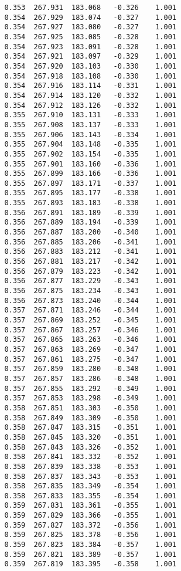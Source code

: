 \begin{verbatim}
   0.353  267.931  183.068   -0.326    1.001
   0.354  267.929  183.074   -0.327    1.001
   0.354  267.927  183.080   -0.327    1.001
   0.354  267.925  183.085   -0.328    1.001
   0.354  267.923  183.091   -0.328    1.001
   0.354  267.921  183.097   -0.329    1.001
   0.354  267.920  183.103   -0.330    1.001
   0.354  267.918  183.108   -0.330    1.001
   0.354  267.916  183.114   -0.331    1.001
   0.354  267.914  183.120   -0.332    1.001
   0.354  267.912  183.126   -0.332    1.001
   0.355  267.910  183.131   -0.333    1.001
   0.355  267.908  183.137   -0.333    1.001
   0.355  267.906  183.143   -0.334    1.001
   0.355  267.904  183.148   -0.335    1.001
   0.355  267.902  183.154   -0.335    1.001
   0.355  267.901  183.160   -0.336    1.001
   0.355  267.899  183.166   -0.336    1.001
   0.355  267.897  183.171   -0.337    1.001
   0.355  267.895  183.177   -0.338    1.001
   0.355  267.893  183.183   -0.338    1.001
   0.356  267.891  183.189   -0.339    1.001
   0.356  267.889  183.194   -0.339    1.001
   0.356  267.887  183.200   -0.340    1.001
   0.356  267.885  183.206   -0.341    1.001
   0.356  267.883  183.212   -0.341    1.001
   0.356  267.881  183.217   -0.342    1.001
   0.356  267.879  183.223   -0.342    1.001
   0.356  267.877  183.229   -0.343    1.001
   0.356  267.875  183.234   -0.343    1.001
   0.356  267.873  183.240   -0.344    1.001
   0.357  267.871  183.246   -0.344    1.001
   0.357  267.869  183.252   -0.345    1.001
   0.357  267.867  183.257   -0.346    1.001
   0.357  267.865  183.263   -0.346    1.001
   0.357  267.863  183.269   -0.347    1.001
   0.357  267.861  183.275   -0.347    1.001
   0.357  267.859  183.280   -0.348    1.001
   0.357  267.857  183.286   -0.348    1.001
   0.357  267.855  183.292   -0.349    1.001
   0.357  267.853  183.298   -0.349    1.001
   0.358  267.851  183.303   -0.350    1.001
   0.358  267.849  183.309   -0.350    1.001
   0.358  267.847  183.315   -0.351    1.001
   0.358  267.845  183.320   -0.351    1.001
   0.358  267.843  183.326   -0.352    1.001
   0.358  267.841  183.332   -0.352    1.001
   0.358  267.839  183.338   -0.353    1.001
   0.358  267.837  183.343   -0.353    1.001
   0.358  267.835  183.349   -0.354    1.001
   0.358  267.833  183.355   -0.354    1.001
   0.359  267.831  183.361   -0.355    1.001
   0.359  267.829  183.366   -0.355    1.001
   0.359  267.827  183.372   -0.356    1.001
   0.359  267.825  183.378   -0.356    1.001
   0.359  267.823  183.384   -0.357    1.001
   0.359  267.821  183.389   -0.357    1.001
   0.359  267.819  183.395   -0.358    1.001

\end{verbatim}
